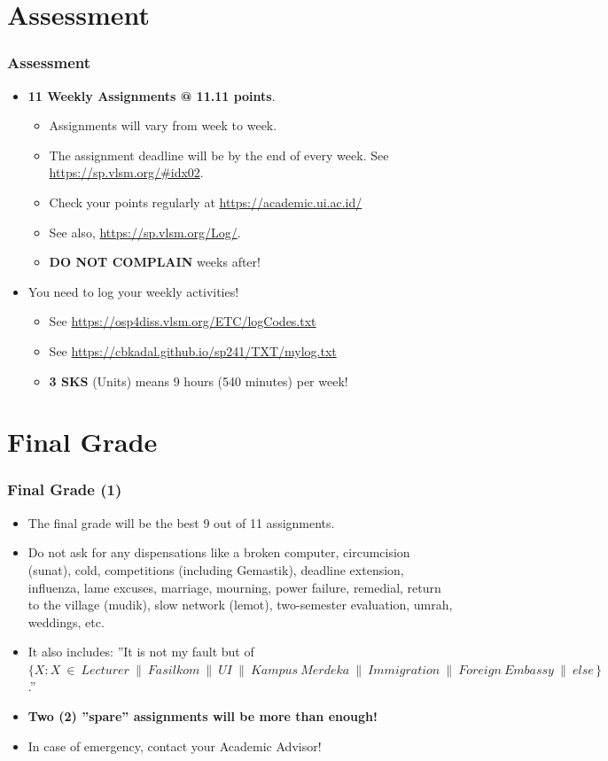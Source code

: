 \documentclass[aspectratio=169, xcolor=table, notheorems, hyperref={pdfpagelabels=false}]{beamer}
\begin{document}
\section{Assessment}
\begin{frame}
\frametitle{Assessment}

\begin{itemize}
\item \textbf{11 Weekly Assignments @ 11.11 points}.
\begin{itemize}
\item Assignments will vary from week to week.
\item The assignment deadline will be by the end of every week.
See \url{https://sp.vlsm.org/\#idx02}.
\item Check your points regularly at \url{https://academic.ui.ac.id/}
\item See also, \url{https://sp.vlsm.org/Log/}.
\item \textbf{DO NOT COMPLAIN} weeks after!
\end{itemize}
\item You need to log your weekly activities!
\begin{itemize}
\item See \url{https://osp4diss.vlsm.org/ETC/logCodes.txt}
\item See \url{https://cbkadal.github.io/sp241/TXT/mylog.txt}
\item \textbf{3 SKS} (Units) means 9 hours (540 minutes) per week!
\end{itemize}
\end{itemize}

\end{frame}

\section{Final Grade}
\begin{frame}
\frametitle{Final Grade (1)}

\begin{itemize}
\item The final grade will be the best 9 out of 11 assignments.
\item Do not ask for any dispensations like a broken computer, circumcision (sunat), cold, competitions 
      (including Gemastik), deadline extension, influenza, lame excuses, marriage, mourning, 
      power failure, remedial, return to the village (mudik), slow network (lemot), two-semester evaluation, umrah,
      weddings, etc. 
\item It also includes: ''It is not my fault but of $\{ X\!: X\ \in\ Lecturer\ \parallel\ Fasilkom\ 
      \parallel\ UI\ \parallel\ Kampus\ Merdeka\ \parallel\ Immigration\ \parallel\ Foreign\ Embassy\ \parallel\ 
      else\, \}$.''
\item \textbf{Two (2) ''spare'' assignments will be more than enough!}
\item In case of emergency, contact your Academic Advisor!
\end{itemize}
\end{frame}
\end{document}
